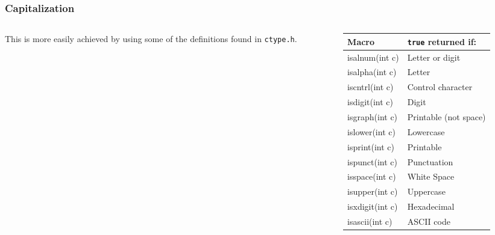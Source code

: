 \begin{frame}[fragile]
\frametitle{Capitalization}
\begin{columns}[T]
\begin{column}{0.45\textwidth}



{\footnotesize
This is more easily achieved by using some of
the definitions found in {\tt ctype.h}.
}
\end{column}

\begin{column}{0.45\textwidth}
\begin{center}
\begin{tabular}{|l|l|} \hline
Macro        & {\tt true} returned if: \\ \hline
isalnum(int c) & Letter or digit \\
isalpha(int c) & Letter \\
iscntrl(int c) & Control character \\
isdigit(int c) & Digit \\
isgraph(int c) & Printable (not space) \\
islower(int c) & Lowercase\\
isprint(int c) & Printable\\
ispunct(int c) & Punctuation\\
isspace(int c) & White Space\\
isupper(int c) & Uppercase\\
isxdigit(int c)& Hexadecimal\\
isascii(int c) & ASCII code \\ \hline
\end{tabular}
\end{center}
\end{column}

\end{columns}
\end{frame}



